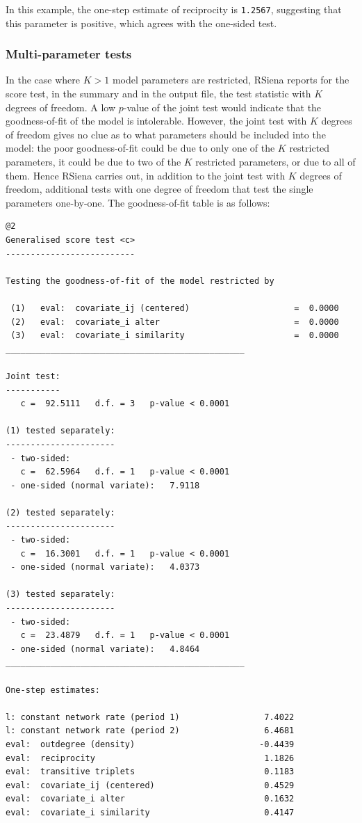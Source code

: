\documentclass[a4paper,fleqn,11pt]{article}
\newcommand{\+}{\, + \,}
\newcommand{\sfn}[1]{\textsf{#1}}
\newcommand{\RS}{{\sf \textsf{RSiena} }}
\begin{document}
In this example, the one-step estimate of reciprocity is {\tt 1.2567},
suggesting that this parameter is positive, which agrees with the one-sided test.

\subsubsection{Multi-parameter tests}

In the case where $K > 1$ model parameters are restricted, \RS
reports for the score test, in the \sfn{summary} and in the output file,
the test statistic with $K$ degrees of freedom. A low
$p$-value of the joint test would indicate that the
goodness-of-fit of the model is intolerable. However, the joint
test with $K$ degrees of freedom gives no clue as to what parameters
should be included into the model: the poor goodness-of-fit could be
due to only one of the $K$ restricted parameters, it could be due to
two of the $K$ restricted parameters, or due to all of them. Hence
\RS carries out, in addition to the joint test with $K$ degrees of
freedom, additional tests with one degree of freedom that test the
single parameters one-by-one. The goodness-of-fit table is as
follows:

{\footnotesize
\begin{verbatim}
@2
Generalised score test <c>
--------------------------

Testing the goodness-of-fit of the model restricted by

 (1)   eval:  covariate_ij (centered)                     =  0.0000
 (2)   eval:  covariate_i alter                           =  0.0000
 (3)   eval:  covariate_i similarity                      =  0.0000
________________________________________________

Joint test:
-----------
   c =  92.5111   d.f. = 3   p-value < 0.0001

(1) tested separately:
----------------------
 - two-sided:
   c =  62.5964   d.f. = 1   p-value < 0.0001
 - one-sided (normal variate):   7.9118

(2) tested separately:
----------------------
 - two-sided:
   c =  16.3001   d.f. = 1   p-value < 0.0001
 - one-sided (normal variate):   4.0373

(3) tested separately:
----------------------
 - two-sided:
   c =  23.4879   d.f. = 1   p-value < 0.0001
 - one-sided (normal variate):   4.8464
________________________________________________

One-step estimates:

l: constant network rate (period 1)                 7.4022
l: constant network rate (period 2)                 6.4681
eval:  outdegree (density)                         -0.4439
eval:  reciprocity                                  1.1826
eval:  transitive triplets                          0.1183
eval:  covariate_ij (centered)                      0.4529
eval:  covariate_i alter                            0.1632
eval:  covariate_i similarity                       0.4147
\end{verbatim}
}
\end{document}
